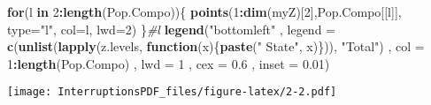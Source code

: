 \documentclass[
]{article}
\newenvironment{Shaded}{\begin{snugshade}}{\end{snugshade}}
\newcommand{\CommentTok}[1]{\textcolor[rgb]{0.56,0.35,0.01}{\textit{#1}}}
\newcommand{\ControlFlowTok}[1]{\textcolor[rgb]{0.13,0.29,0.53}{\textbf{#1}}}
\newcommand{\DataTypeTok}[1]{\textcolor[rgb]{0.13,0.29,0.53}{#1}}
\newcommand{\DecValTok}[1]{\textcolor[rgb]{0.00,0.00,0.81}{#1}}
\newcommand{\FloatTok}[1]{\textcolor[rgb]{0.00,0.00,0.81}{#1}}
\newcommand{\KeywordTok}[1]{\textcolor[rgb]{0.13,0.29,0.53}{\textbf{#1}}}
\newcommand{\NormalTok}[1]{#1}
\newcommand{\OperatorTok}[1]{\textcolor[rgb]{0.81,0.36,0.00}{\textbf{#1}}}
\newcommand{\StringTok}[1]{\textcolor[rgb]{0.31,0.60,0.02}{#1}}
\begin{document}
\begin{Shaded}
\begin{Highlighting}[]
\ControlFlowTok{for}\NormalTok{(l }\ControlFlowTok{in} \DecValTok{2}\OperatorTok{:}\KeywordTok{length}\NormalTok{(Pop.Compo))\{}
   \KeywordTok{points}\NormalTok{(}\DecValTok{1}\OperatorTok{:}\KeywordTok{dim}\NormalTok{(myZ)[}\DecValTok{2}\NormalTok{],Pop.Compo[[l]], }\DataTypeTok{type=}\StringTok{"l"}\NormalTok{, }\DataTypeTok{col=}\NormalTok{l, }\DataTypeTok{lwd=}\DecValTok{2}\NormalTok{)}
\NormalTok{\}}\CommentTok{#l}
\KeywordTok{legend}\NormalTok{(}\StringTok{"bottomleft"}
\NormalTok{       , }\DataTypeTok{legend =}  \KeywordTok{c}\NormalTok{(}\KeywordTok{unlist}\NormalTok{(}\KeywordTok{lapply}\NormalTok{(z.levels, }\ControlFlowTok{function}\NormalTok{(x)\{}\KeywordTok{paste}\NormalTok{(}\StringTok{" State"}\NormalTok{, x)\})), }\StringTok{"Total"}\NormalTok{)}
\NormalTok{       , }\DataTypeTok{col =} \DecValTok{1}\OperatorTok{:}\KeywordTok{length}\NormalTok{(Pop.Compo)}
\NormalTok{       , }\DataTypeTok{lwd =} \DecValTok{1}
\NormalTok{       , }\DataTypeTok{cex =} \FloatTok{0.6}
\NormalTok{       , }\DataTypeTok{inset =} \FloatTok{0.01}\NormalTok{)}
\end{Highlighting}
\end{Shaded}

\texttt{[image: InterruptionsPDF\_files/figure-latex/2-2.pdf]}
\end{document}
